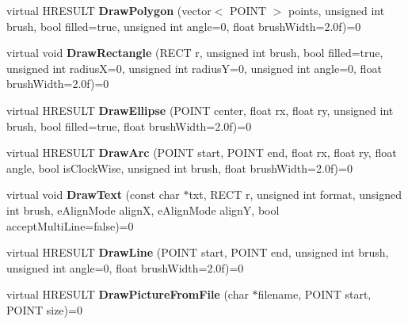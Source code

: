 \begin{DoxyCompactItemize}
\item 
\hypertarget{class_engine_render_ae57893f1f5e300b15298d9aef667dd21}{virtual H\-R\-E\-S\-U\-L\-T {\bfseries Draw\-Polygon} (vector$<$ P\-O\-I\-N\-T $>$ points, unsigned int brush, bool filled=true, unsigned int angle=0, float brush\-Width=2.\-0f)=0}\label{class_engine_render_ae57893f1f5e300b15298d9aef667dd21}

\item 
\hypertarget{class_engine_render_a9e34edc812b813a2836f118276dc117e}{virtual void {\bfseries Draw\-Rectangle} (R\-E\-C\-T r, unsigned int brush, bool filled=true, unsigned int radius\-X=0, unsigned int radius\-Y=0, unsigned int angle=0, float brush\-Width=2.\-0f)=0}\label{class_engine_render_a9e34edc812b813a2836f118276dc117e}

\item 
\hypertarget{class_engine_render_a154177a8860a56b0039ac61ba77448b2}{virtual H\-R\-E\-S\-U\-L\-T {\bfseries Draw\-Ellipse} (P\-O\-I\-N\-T center, float rx, float ry, unsigned int brush, bool filled=true, float brush\-Width=2.\-0f)=0}\label{class_engine_render_a154177a8860a56b0039ac61ba77448b2}

\item 
\hypertarget{class_engine_render_a8f07ced0811c148a75f8bb77fb748071}{virtual H\-R\-E\-S\-U\-L\-T {\bfseries Draw\-Arc} (P\-O\-I\-N\-T start, P\-O\-I\-N\-T end, float rx, float ry, float angle, bool is\-Clock\-Wise, unsigned int brush, float brush\-Width=2.\-0f)=0}\label{class_engine_render_a8f07ced0811c148a75f8bb77fb748071}

\item 
\hypertarget{class_engine_render_a688754eb145ef5263e7b2a5fe46c3b50}{virtual void {\bfseries Draw\-Text} (const char $\ast$txt, R\-E\-C\-T r, unsigned int format, unsigned int brush, e\-Align\-Mode align\-X, e\-Align\-Mode align\-Y, bool accept\-Multi\-Line=false)=0}\label{class_engine_render_a688754eb145ef5263e7b2a5fe46c3b50}

\item 
\hypertarget{class_engine_render_a06012d41e9f0d9d46718ed1a2b8fa779}{virtual H\-R\-E\-S\-U\-L\-T {\bfseries Draw\-Line} (P\-O\-I\-N\-T start, P\-O\-I\-N\-T end, unsigned int brush, unsigned int angle=0, float brush\-Width=2.\-0f)=0}\label{class_engine_render_a06012d41e9f0d9d46718ed1a2b8fa779}

\item 
\hypertarget{class_engine_render_a1261a3ce472a2b93bd382ebd61be4983}{virtual H\-R\-E\-S\-U\-L\-T {\bfseries Draw\-Picture\-From\-File} (char $\ast$filename, P\-O\-I\-N\-T start, P\-O\-I\-N\-T size)=0}\label{class_engine_render_a1261a3ce472a2b93bd382ebd61be4983}


\end{DoxyCompactItemize}
